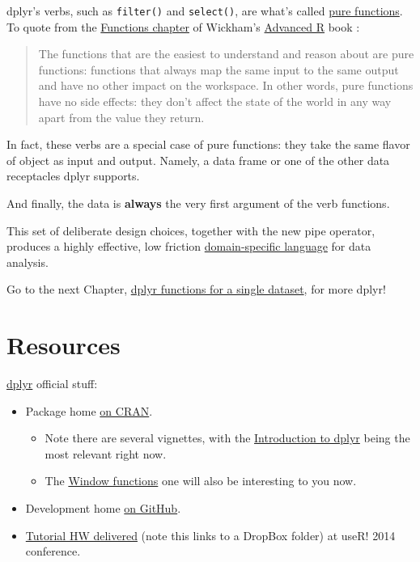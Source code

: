\documentclass[
]{book}
\providecommand{\tightlist}{%
  \setlength{\itemsep}{0pt}\setlength{\parskip}{0pt}}
\begin{document}
dplyr's verbs, such as \texttt{filter()} and \texttt{select()}, are what's called \href{https://en.wikipedia.org/wiki/Pure_function}{pure functions}. To quote from the \href{http://adv-r.had.co.nz/Functions.html}{Functions chapter} of Wickham's \href{http://adv-r.had.co.nz}{Advanced R} book \citeyearpar{wickham2015a}:

\begin{quote}
The functions that are the easiest to understand and reason about are pure functions: functions that always map the same input to the same output and have no other impact on the workspace. In other words, pure functions have no side effects: they don't affect the state of the world in any way apart from the value they return.
\end{quote}

In fact, these verbs are a special case of pure functions: they take the same flavor of object as input and output. Namely, a data frame or one of the other data receptacles dplyr supports.

And finally, the data is \textbf{always} the very first argument of the verb functions.

This set of deliberate design choices, together with the new pipe operator, produces a highly effective, low friction \href{http://adv-r.had.co.nz/dsl.html}{domain-specific language} for data analysis.

Go to the next Chapter, \protect\hyperlink{dplyr-single}{dplyr functions for a single dataset}, for more dplyr!

\hypertarget{resources}{%
\section{Resources}\label{resources}}

\href{https://dplyr.tidyverse.org}{dplyr} official stuff:

\begin{itemize}
\tightlist
\item
  Package home \href{https://cloud.r-project.org/package=dplyr}{on CRAN}.

  \begin{itemize}
  \tightlist
  \item
    Note there are several vignettes, with the \href{https://dplyr.tidyverse.org/articles/dplyr.html}{Introduction to dplyr} being the most relevant right now.
  \item
    The \href{https://dplyr.tidyverse.org/articles/window-functions.html}{Window functions} one will also be interesting to you now.
  \end{itemize}
\item
  Development home \href{https://github.com/hadley/dplyr}{on GitHub}.
\item
  \href{https://www.dropbox.com/sh/i8qnluwmuieicxc/AAAgt9tIKoIm7WZKIyK25lh6a}{Tutorial HW delivered} (note this links to a DropBox folder) at useR! 2014 conference.
\end{itemize}
\end{document}
